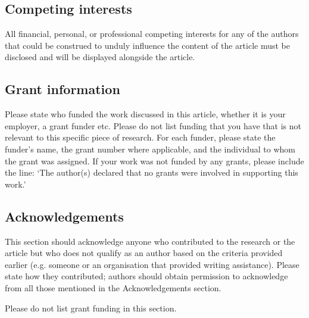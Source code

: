 \documentclass[10pt,a4paper,twocolumn]{article}
\begin{document}
\subsection*{Competing interests}
All financial, personal, or professional competing interests for any of the authors that
could be construed to unduly influence the content of the article must be disclosed and
will be displayed alongside the article.

\subsection*{Grant information}
Please state who funded the work discussed in this article, whether it is your employer,
a grant funder etc. Please do not list funding that you have that is not relevant to this
specific piece of research. For each funder, please state the funder’s name, the grant
number where applicable, and the individual to whom the grant was assigned.
If your work was not funded by any grants, please include the line: ‘The author(s)
declared that no grants were involved in supporting this work.’

\subsection*{Acknowledgements}
This section should acknowledge anyone who contributed to the research or the
article but who does not qualify as an author based on the criteria provided earlier
(e.g. someone or an organisation that provided writing assistance). Please state how
they contributed; authors should obtain permission to acknowledge from all those
mentioned in the Acknowledgements section.

Please do not list grant funding in this section.


{\small
}


\end{document}
